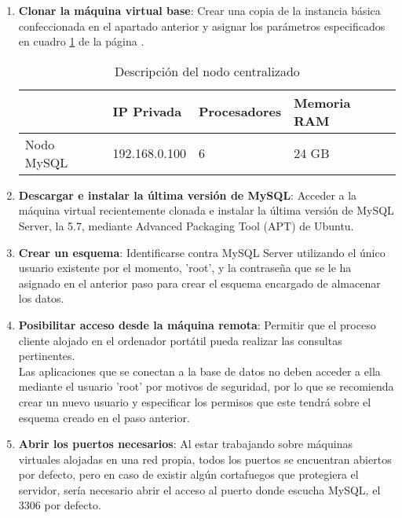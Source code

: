 \begin{enumerate}
	
\item \textbf{Clonar la máquina virtual base}: Crear una copia de la instancia básica confeccionada en el apartado anterior y asignar los parámetros especificados en cuadro \ref{nodo-mysql} de la página \pageref{nodo-mysql}.

\begin{table}[h!]
	\centering
	\begin{tabular}{|l||l|l|l|}
		
		\hline
		
		& \textbf{IP Privada} & \textbf{Procesadores} & \textbf{Memoria RAM} \\
		
		\hline
		\hline
		
		Nodo MySQL & 192.168.0.100 & 6 & 24 GB \\
		
		\hline
		
	\end{tabular}
	\caption{Descripción del nodo centralizado}
	\label{nodo-mysql}
\end{table}

\item \textbf{Descargar e instalar la última versión de MySQL}: Acceder a la máquina virtual recientemente clonada e instalar la última versión de MySQL Server, la 5.7, mediante Advanced Packaging Tool (APT) de Ubuntu.

\item \textbf{Crear un esquema}: Identificarse contra MySQL Server utilizando el único usuario existente por el momento, 'root', y la contraseña que se le ha asignado en el anterior paso para crear el esquema encargado de almacenar los datos.

\item \textbf{Posibilitar acceso desde la máquina remota}: Permitir que el proceso cliente alojado en el ordenador portátil pueda realizar las consultas pertinentes.\\

Las aplicaciones que se conectan a la base de datos no deben acceder a ella mediante el usuario 'root' por motivos de seguridad, por lo que se recomienda crear un nuevo usuario y especificar los permisos que este tendrá sobre el esquema creado en el paso anterior.

\item \textbf{Abrir los puertos necesarios}: Al estar trabajando sobre máquinas virtuales alojadas en una red propia, todos los puertos se encuentran abiertos por defecto, pero en caso de existir algún cortafuegos que protegiera el servidor, sería necesario abrir el acceso al puerto donde escucha MySQL, el 3306 por defecto.

\end{enumerate}


